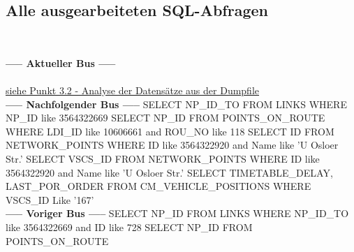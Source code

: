 \documentclass[a4paper, 12.5pt]{scrartcl}
\begin{document}
\subsection{Alle ausgearbeiteten SQL-Abfragen}
\\
\begin{small}
\textbf{----- Aktueller Bus -----}
\\ \\
\hyperref[sec:jump]{siehe Punkt 3.2 - Analyse der Datensätze aus der Dumpfile}
\newline 
\\ \textbf{----- Nachfolgender Bus -----}
\newline 
\newline SELECT NP\_ID\_TO
\newline FROM LINKS
\newline WHERE NP\_ID like 3564322669
\newline 
\newline SELECT NP\_ID
\newline FROM POINTS\_ON\_ROUTE
\newline WHERE LDI\_ID like 10606661 and ROU\_NO like 118
\newline 
\newline SELECT ID
\newline FROM NETWORK\_POINTS
\newline WHERE ID like 3564322920 and Name like 'U Osloer Str.' 
\newline 
\newline SELECT VSCS\_ID
\newline FROM NETWORK\_POINTS
\newline WHERE ID like 3564322920 and Name like 'U Osloer Str.'
\newline 
\newline SELECT TIMETABLE\_DELAY, LAST\_POR\_ORDER
\newline FROM CM\_VEHICLE\_POSITIONS
\newline WHERE VSCS\_ID Like '167'
\newline 
\\ \textbf{----- Voriger Bus -----}
\newline 
\newline SELECT NP\_ID
\newline FROM LINKS
\newline WHERE NP\_ID\_TO like 3564322669 and ID like 728
\newline 
\newline SELECT NP\_ID
\newline FROM POINTS\_ON\_ROUTE

\end{small}
\end{document}
